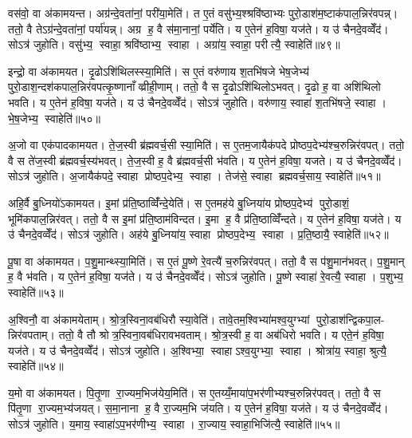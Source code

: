 वस॑वो॒ वा अ॑कामयन्त। अग्र॑न्दे॒वता॑नां॒ परी॑या॒मेति॑। त ए॒तं वसु॑भ्य॒श्श्रवि॑ष्ठाभ्यः पुरो॒डाश॑म॒ष्टाक॑पाल॒न्निर॑वपन्न्। ततो॒ वै तेऽग्र॑न्दे॒वता॑नां॒ पर्या॑यन्न्। अग्र ह॒ वै स॑मा॒नानां॒ पर्ये॑ति। य ए॒तेन॑ ह॒विषा॒ यज॑ते। य उ॑ चैनदे॒वव्वेँद॑। सोऽत्र॑ जुहोति। वसु॑भ्य॒ स्वाहा॒ श्रवि॑ष्ठाभ्य॒ स्वाहा। अग्रा॑य॒ स्वाहा॒ परीत्यै॒ स्वाहेति॑॥४९॥

इन्द्रो॒ वा अ॑कामयत। दृ॒ढोऽशि॑थिलस्स्या॒मिति॑। स ए॒तं वरु॑णाय श॒तभि॑षजे भेष॒जेभ्य॑ पुरो॒डाश॒न्दश॑कपाल॒न्निर॑वपत्कृ॒ष्णानाँव्व्रीही॒णाम्। ततो॒ वै स दृ॒ढोऽशि॑थिलोऽभवत्। दृ॒ढो ह॒ वा अशि॑थिलो भवति। य ए॒तेन॑ ह॒विषा॒ यज॑ते। य उ॑ चैनदे॒वव्वेँद॑। सोऽत्र॑ जुहोति। वरु॑णाय॒ स्वाहा॑ श॒तभि॑षजे॒ स्वाहा। भे॒ष॒जेभ्य॒ स्वाहेति॑॥५०॥

अ॒जो वा एक॑पादकामयत। ते॒ज॒स्वी ब्र॑ह्मवर्च॒सी स्या॒मिति॑। स ए॒तम॒जायैक॑पदे प्रोष्ठप॒देभ्य॑श्च॒रुन्निर॑वपत्। ततो॒ वै स ते॑ज॒स्वी ब्र॑ह्मवर्च॒स्य॑भवत्। ते॒ज॒स्वी ह॒ वै ब्र॑ह्मवर्च॒सी भ॑वति। य ए॒तेन॑ ह॒विषा॒ यजते। य उ॑ चैनदे॒वव्वेँद॑। सोऽत्र॑ जुहोति। अ॒जायैक॑पदे॒ स्वाहा प्रोष्ठप॒देभ्य॒ स्वाहा। तेज॑से॒ स्वाहा ब्रह्मवर्च॒साय॒ स्वाहेति॑॥५१॥

अहि॒र्वै बु॒ध्नियो॑ऽकामयत। इ॒मां प्र॑ति॒ष्ठाव्विँ॑न्दे॒येति॑। स ए॒तमह॑ये बु॒ध्निया॑य प्रोष्ठप॒देभ्य॑ पुरो॒डाशं॒ भूमि॑कपाल॒न्निर॑वत्। ततो॒ वै स इ॒मां प्र॑ति॒ष्ठाम॑विन्दत। इ॒मा ह॒ वै प्र॑ति॒ष्ठाव्विँ॑न्दते। य ए॒तेन॑ ह॒विषा॒ यज॑ते। य उ॑ चैनदे॒वव्वेँद॑। सोऽत्र॑ जुहोति। अह॑ये बु॒ध्निया॑य॒ स्वाहा प्रोष्ठप॒देभ्य॒ स्वाहा। प्र॒ति॒ष्ठायै॒ स्वाहेति॑॥५२॥

पू॒षा वा अ॑कामयत। प॒शु॒मान्थ्स्या॒मिति॑। स ए॒तं पू॒ष्णे रे॒वत्यै॑ च॒रुन्निर॑वपत्। ततो॒ वै स प॑शु॒मान॑भवत्। प॒शु॒मान् ह॒ वै भ॑वति। य ए॒तेन॑ ह॒विषा॒ यज॑ते। य उ॑ चैनदे॒वव्वेँद॑। सोऽत्र॑ जुहोति। पू॒ष्णे स्वाहा॑ रे॒वत्यै॒ स्वाहा। प॒शुभ्य॒ स्वाहेति॑॥५३॥

अ॒श्विनौ॒ वा अ॑कामयेताम्। श्रो॒त्र॒स्विना॒वब॑धिरौ स्या॒वेति॑। तावे॒तम॒श्विभ्या॑मश्व॒युग्भ्यां पुरो॒डाश॑न्द्विकपा॒ल- न्निर॑वपताम्। ततो॒ वै तौ श्रोत्र॒स्विना॒वब॑धिरावभवताम्। श्रो॒त्र॒स्वी ह॒ वा अब॑धिरो भवति। य एते॒न॑ ह॒विषा॒ यज॑ते। य उ॑ चैनदे॒वव्वेँद॑। सोऽत्र॑ जुहोति। अ॒श्विभ्या॒ स्वाहाऽश्व॒युग्भ्या॒ स्वाहा। श्रोत्रा॑य॒ स्वाहा॒ श्रुत्यै॒ स्वाहेति॑॥५४॥

य॒मो वा अ॑कामयत। पि॒तृ॒णा रा॒ज्यम॒भिज॑येय॒मिति॑। स ए॒तय्यँ॒माया॑प॒भर॑णीभ्यश्च॒रुन्निर॑पवत्। ततो॒ वै स पि॑तृ॒णा रा॒ज्यम॒भ्य॑जयत्। स॒मा॒नाना ह॒ वै रा॒ज्यम॒भि ज॑यति। य ए॒तेन॑ ह॒विषा॒ यज॑ते। य उ॑ चैनदे॒वव्वेँद॑। सोऽत्र॑ जुहोति। य॒माय॒ स्वाहा॑ऽप॒भर॑णीभ्य॒ स्वाहा। रा॒ज्याय॒ स्वाहा॒भिजि॑त्यै॒ स्वाहेति॑॥५५॥

